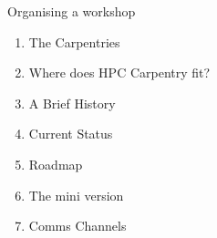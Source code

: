 \begin{frame}{Organising a workshop}
	\begin{enumerate}
		\item The Carpentries
		\item Where does HPC Carpentry fit?
		\item A Brief History
		\item Current Status
		\item Roadmap
		\item The mini version
		\item Comms Channels
	\end{enumerate}
\end{frame}